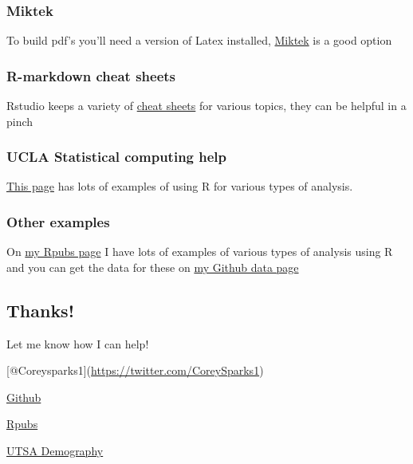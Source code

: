 \documentclass[]{article}
\begin{document}
\subsubsection{Miktek}\label{miktek}

To build pdf's you'll need a version of Latex installed,
\href{https://miktex.org/download}{Miktek} is a good option

\subsubsection{R-markdown cheat sheets}\label{r-markdown-cheat-sheets}

Rstudio keeps a variety of
\href{https://www.rstudio.com/resources/cheatsheets/}{cheat sheets} for
various topics, they can be helpful in a pinch

\subsubsection{UCLA Statistical computing
help}\label{ucla-statistical-computing-help}

\href{http://www.ats.ucla.edu/stat/}{This page} has lots of examples of
using R for various types of analysis.

\subsubsection{Other examples}\label{other-examples}

On \href{http://rpubs.com/corey_sparks}{my Rpubs page} I have lots of
examples of various types of analysis using R and you can get the data
for these on \href{https://github.com/coreysparks/data}{my Github data
page}

\subsection{Thanks!}\label{thanks}

Let me know how I can help!

{[}@Coreysparks1{]}(\url{https://twitter.com/CoreySparks1})

\href{https://github.com/coreysparks}{Github}

\href{http://rpubs.com/corey_sparks}{Rpubs}

\href{http://copp.utsa.edu/demography/}{UTSA Demography}
\end{document}
